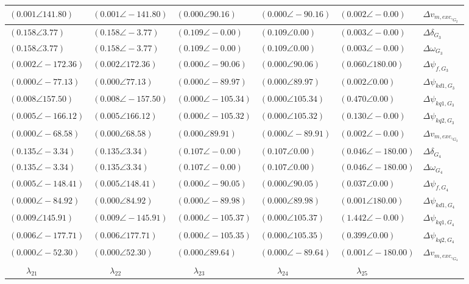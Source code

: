 \begin{tabular}{lllll|l}
$(0.001 \angle 141.80)$	& $(0.001 \angle -141.80)$	& $(0.000 \angle 90.16)$	& $(0.000 \angle -90.16)$	& $(0.002 \angle -0.00)$	& $\Delta v_{m,exc,_{G_2}}$ \\ 
 \hline 
$\mathbf{(0.158 \angle 3.77)}$	& $\mathbf{(0.158 \angle -3.77)}$	& $\mathbf{(0.109 \angle -0.00)}$	& $\mathbf{(0.109 \angle 0.00)}$	& $(0.003 \angle -0.00)$	& $\Delta\delta_{G_3}$ \\ 
$\mathbf{(0.158 \angle 3.77)}$	& $\mathbf{(0.158 \angle -3.77)}$	& $\mathbf{(0.109 \angle -0.00)}$	& $\mathbf{(0.109 \angle 0.00)}$	& $(0.003 \angle -0.00)$	& $\Delta\omega_{G_3}$ \\ 
$(0.002 \angle -172.36)$	& $(0.002 \angle 172.36)$	& $(0.000 \angle -90.06)$	& $(0.000 \angle 90.06)$	& $\mathbf{(0.060 \angle 180.00)}$	& $\Delta \psi_{f,G_3}$ \\ 
$(0.000 \angle -77.13)$	& $(0.000 \angle 77.13)$	& $(0.000 \angle -89.97)$	& $(0.000 \angle 89.97)$	& $(0.002 \angle 0.00)$	& $\Delta \psi_{kd1,G_3}$ \\ 
$(0.008 \angle 157.50)$	& $(0.008 \angle -157.50)$	& $(0.000 \angle -105.34)$	& $(0.000 \angle 105.34)$	& $\mathbf{(0.470 \angle 0.00)}$	& $\Delta \psi_{kq1,G_3}$ \\ 
$(0.005 \angle -166.12)$	& $(0.005 \angle 166.12)$	& $(0.000 \angle -105.32)$	& $(0.000 \angle 105.32)$	& $\mathbf{(0.130 \angle -0.00)}$	& $\Delta \psi_{kq2,G_3}$ \\ 
$(0.000 \angle -68.58)$	& $(0.000 \angle 68.58)$	& $(0.000 \angle 89.91)$	& $(0.000 \angle -89.91)$	& $(0.002 \angle -0.00)$	& $\Delta v_{m,exc,_{G_3}}$ \\ 
 \hline 
$\mathbf{(0.135 \angle -3.34)}$	& $\mathbf{(0.135 \angle 3.34)}$	& $\mathbf{(0.107 \angle -0.00)}$	& $\mathbf{(0.107 \angle 0.00)}$	& $(0.046 \angle -180.00)$	& $\Delta\delta_{G_4}$ \\ 
$\mathbf{(0.135 \angle -3.34)}$	& $\mathbf{(0.135 \angle 3.34)}$	& $\mathbf{(0.107 \angle -0.00)}$	& $\mathbf{(0.107 \angle 0.00)}$	& $(0.046 \angle -180.00)$	& $\Delta\omega_{G_4}$ \\ 
$(0.005 \angle -148.41)$	& $(0.005 \angle 148.41)$	& $(0.000 \angle -90.05)$	& $(0.000 \angle 90.05)$	& $(0.037 \angle 0.00)$	& $\Delta \psi_{f,G_4}$ \\ 
$(0.000 \angle -84.92)$	& $(0.000 \angle 84.92)$	& $(0.000 \angle -89.98)$	& $(0.000 \angle 89.98)$	& $(0.001 \angle 180.00)$	& $\Delta \psi_{kd1,G_4}$ \\ 
$(0.009 \angle 145.91)$	& $(0.009 \angle -145.91)$	& $(0.000 \angle -105.37)$	& $(0.000 \angle 105.37)$	& $\mathbf{(1.442 \angle -0.00)}$	& $\Delta \psi_{kq1,G_4}$ \\ 
$(0.006 \angle -177.71)$	& $(0.006 \angle 177.71)$	& $(0.000 \angle -105.35)$	& $(0.000 \angle 105.35)$	& $\mathbf{(0.399 \angle 0.00)}$	& $\Delta \psi_{kq2,G_4}$ \\ 
$(0.000 \angle -52.30)$	& $(0.000 \angle 52.30)$	& $(0.000 \angle 89.64)$	& $(0.000 \angle -89.64)$	& $(0.001 \angle -180.00)$	& $\Delta v_{m,exc,_{G_4}}$ \\ 
 \hline 
\hline 
$\qquad\lambda_{21}$	&$\qquad\lambda_{22}$	&$\qquad\lambda_{23}$	&$\qquad\lambda_{24}$	&$\qquad\lambda_{25}$	&
\end{tabular}

